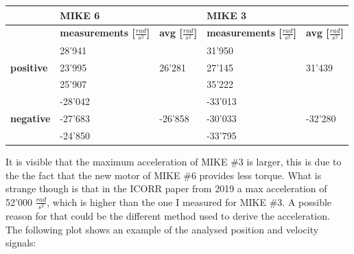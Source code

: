 \begin{table}[h]
\begin{tabular}{|l|ll|ll|}
\hline
                  & \multicolumn{2}{l|}{\textbf{MIKE 6}}                      & \multicolumn{2}{l|}{\textbf{MIKE 3}}                      \\ \hline
                  & \multicolumn{1}{l|}{\textbf{measurements [$\frac{rad}{s^2}$]}} & \textbf{avg [$\frac{rad}{s^2}$]} & \multicolumn{1}{l|}{\textbf{measurements [$\frac{rad}{s^2}$]}} & \textbf{avg [$\frac{rad}{s^2}$]} \\ \hline
                  & \multicolumn{1}{l|}{28'941}                &              & \multicolumn{1}{l|}{31'950}                 &              \\ \cline{2-2} \cline{4-4}
\textbf{positive} & \multicolumn{1}{l|}{23'995}                & 26'281        & \multicolumn{1}{l|}{27'145}                 & 31'439        \\ \cline{2-2} \cline{4-4}
                  & \multicolumn{1}{l|}{25'907}                &              & \multicolumn{1}{l|}{35'222}                 &              \\ \hline
                  & \multicolumn{1}{l|}{-28'042}                      &              & \multicolumn{1}{l|}{-33'013}                &              \\ \cline{2-2} \cline{4-4}
\textbf{negative} & \multicolumn{1}{l|}{-27'683}                      & -26'858             & \multicolumn{1}{l|}{-30'033}                & -32'280      \\ \cline{2-2} \cline{4-4}
                  & \multicolumn{1}{l|}{-24'850}                      &              & \multicolumn{1}{l|}{-33'795}                &              \\ \hline
\end{tabular}
\end{table}

It is visible that the maximum acceleration of MIKE \#3 is larger, this is due to the the fact that the new motor of MIKE \#6 provides less torque. What is strange though is that in the ICORR paper from 2019 \cite{icorr} a max acceleration of 52'000 $\frac{rad}{s^2}$, which is higher than the one I measured for MIKE \#3. A possible reason for that could be the different method used to derive the acceleration.\\

The following plot shows an example of the analysed position and velocity signals:

